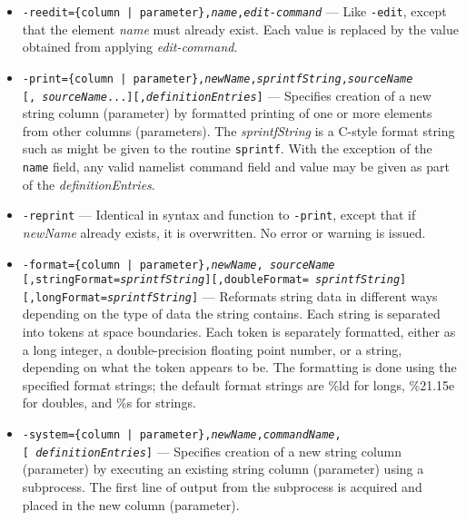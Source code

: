 \begin{itemize}
\begin{itemize}
\begin{itemize}
        If {\em sourceName} contains wildcards, then {\em newName} must contain at least one occurrence of the string
``\%s''.  In this case, for each name that matches {\em sourceName}, an additional element is created, with a
name created by substituting the name for ``\%s'' in {\em newName}.

         \item {\tt -reedit=\{column | parameter\},{\em name},{\em edit-command}} --- Like {\tt -edit},
except that the element {\em name} must already exist.  Each value is replaced by the value obtained from
applying {\em edit-command}.
         
        \item {\tt -print=\{column | parameter\},{\em newName},{\em sprintfString},{\em sourceName}}\\ {\tt [,{\em
sourceName}...][,{\em definitionEntries}]} --- Specifies creation of a new string column (parameter) by formatted
printing of one or more elements from other columns (parameters).  The {\em sprintfString} is a C-style format string
such as might be given to the routine {\tt sprintf}.  With the exception of the {\tt name} field, any valid namelist
command field and value may be given as part of the {\em definitionEntries}.

        \item {\tt -reprint} --- Identical in syntax and function to {\tt -print}, except that if {\em newName} 
already exists, it is overwritten.  No error or warning is issued.

        \item {\tt -format=\{column | parameter\},{\em newName},{\em
sourceName}} \\ {\tt [,stringFormat={\em sprintfString}][,doubleFormat={\em
sprintfString}]} \\ {\tt [,longFormat={\em sprintfString}]} --- Reformats string
data in different ways depending on the type of data the string
contains.  Each string is separated into tokens at space boundaries.
Each token is separately formatted, either as a long integer, a
double-precision floating point number, or a string, depending on what
the token appears to be.  The formatting is done using the specified
format strings; the default format strings are \%ld for longs,
\%21.15e for doubles, and \%s for strings.

         \item {\tt -system=\{column | parameter\},{\em newName},{\em commandName},}\\ {\tt [{\em
definitionEntries}]} --- Specifies creation of a new string column (parameter) by executing an existing string
column (parameter) using a subprocess.  The first line of output from the subprocess is acquired and placed in the
new column (parameter).


\end{itemize}
\end{itemize}
\end{itemize}
